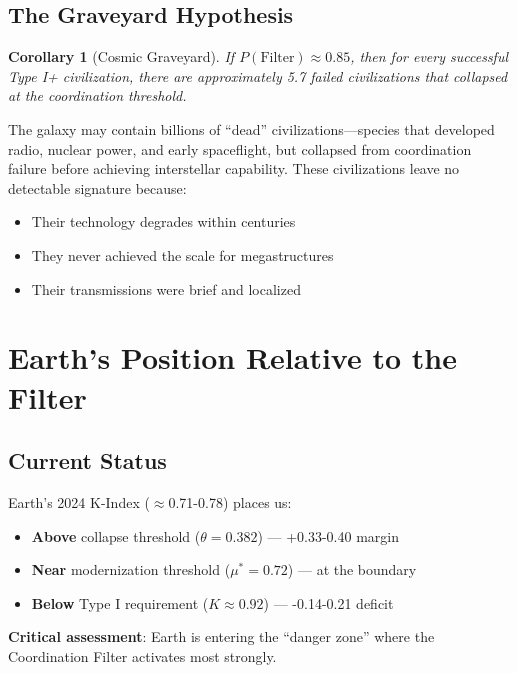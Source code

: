 \documentclass[11pt,a4paper]{article}
\newtheorem{corollary}{Corollary}
\begin{document}
\subsection{The Graveyard Hypothesis}

\begin{corollary}[Cosmic Graveyard]
If $P(\text{Filter}) \approx 0.85$, then for every successful Type I+ civilization, there are approximately 5.7 failed civilizations that collapsed at the coordination threshold.
\end{corollary}

The galaxy may contain billions of ``dead'' civilizations---species that developed radio, nuclear power, and early spaceflight, but collapsed from coordination failure before achieving interstellar capability. These civilizations leave no detectable signature because:
\begin{itemize}
    \item Their technology degrades within centuries
    \item They never achieved the scale for megastructures
    \item Their transmissions were brief and localized
\end{itemize}

\section{Earth's Position Relative to the Filter}

\subsection{Current Status}

Earth's 2024 K-Index ($\approx$0.71-0.78) places us:
\begin{itemize}
    \item \textbf{Above} collapse threshold ($\theta = 0.382$) --- +0.33-0.40 margin
    \item \textbf{Near} modernization threshold ($\mu^* = 0.72$) --- at the boundary
    \item \textbf{Below} Type I requirement ($K \approx 0.92$) --- -0.14-0.21 deficit
\end{itemize}

\textbf{Critical assessment}: Earth is entering the ``danger zone'' where the Coordination Filter activates most strongly.
\end{document}
